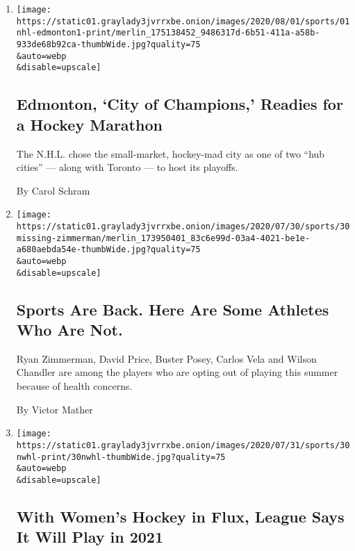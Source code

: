 \begin{enumerate}
\def\labelenumi{\arabic{enumi}.}
\item
  \href{/2020/08/01/sports/hockey/edmonton-nhl-playoffs.html}{}

  \texttt{[image: https://static01.graylady3jvrrxbe.onion/images/2020/08/01/sports/01nhl-edmonton1-print/merlin\_175138452\_9486317d-6b51-411a-a58b-933de68b92ca-thumbWide.jpg?quality=75\\\&auto=webp\\\&disable=upscale]}

  \hypertarget{edmonton-city-of-champions-readies-for-a-hockey-marathon}{%
  \subsection{Edmonton, `City of Champions,' Readies for a Hockey
  Marathon}\label{edmonton-city-of-champions-readies-for-a-hockey-marathon}}

  The N.H.L. chose the small-market, hockey-mad city as one of two ``hub
  cities'' --- along with Toronto --- to host its playoffs.

  By Carol Schram
\item
  \href{/2020/07/30/sports/players-opt-out.html}{}

  \texttt{[image: https://static01.graylady3jvrrxbe.onion/images/2020/07/30/sports/30missing-zimmerman/merlin\_173950401\_83c6e99d-03a4-4021-be1e-a680aebda54e-thumbWide.jpg?quality=75\\\&auto=webp\\\&disable=upscale]}

  \hypertarget{sports-are-back-here-are-some-athletes-who-are-not}{%
  \subsection{Sports Are Back. Here Are Some Athletes Who Are
  Not.}\label{sports-are-back-here-are-some-athletes-who-are-not}}

  Ryan Zimmerman, David Price, Buster Posey, Carlos Vela and Wilson
  Chandler are among the players who are opting out of playing this
  summer because of health concerns.

  By Victor Mather
\item
  \href{/2020/07/30/sports/hockey/nwhl-postpone-season.html}{}

  \texttt{[image: https://static01.graylady3jvrrxbe.onion/images/2020/07/31/sports/30nwhl-print/30nwhl-thumbWide.jpg?quality=75\\\&auto=webp\\\&disable=upscale]}

  \hypertarget{with-womens-hockey-in-flux-league-says-it-will-play-in-2021}{%
  \subsection{With Women's Hockey in Flux, League Says It Will Play in
  2021}\label{with-womens-hockey-in-flux-league-says-it-will-play-in-2021}}


\end{enumerate}
